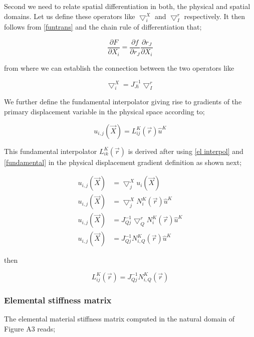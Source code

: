 Second we need to relate spatial differentiation in both, the physical and spatial domains.  Let us define these operators like $\bigtriangledown_i^X$ and $\bigtriangledown_I^r$ respectively. It then follows from \eqref{funtrans} and the chain rule of differentiation that;

\begin{equation}
\dfrac{\partial F}{\partial X_i}=\dfrac{\partial f}{\partial r_J}\dfrac{\partial r_J}{\partial X_i}
\label{chain}
\end{equation}

from where we can establish the connection between the two operators like


\begin{equation}
\bigtriangledown_i^X=J_{Ji}^{-1}\bigtriangledown_I^r
\label{fundamental}
\end{equation}

We further define the fundamental interpolator giving rise to gradients of the primary displacement variable in the physical space according to;


\begin{equation}
u_{i,j}(\vec{X})=L_{ij}^K(\vec{r})\hat{u}^K
\label{fund operator}
\end{equation}


This fundamental interpolator  $L_{ik}^K(\vec{r})$ is derived after using \eqref{el interpol} and \eqref{fundamental} in the physical displacement gradient definition as shown next;


\[
\begin{aligned}
u_{i,j}(\vec{X})&=\bigtriangledown_j^X u_i(\vec{X})\\
u_{i,j}(\vec{X})&=\bigtriangledown_j^X N_i^K(\vec{r})\hat{u}^K\\
u_{i,j}(\vec{X})&=J_{Qj}^{-1}\bigtriangledown_Q^r N_i^K(\vec{r})\hat{u}^K\\
u_{i,j}(\vec{X})&=J_{Qj}^{-1}N_{i,Q}^K(\vec{r})\hat{u}^K
\end{aligned}
\]

then

\begin{equation}
L_{ij}^K(\vec{r})=J_{Qj}^{-1}N_{i,Q}^K(\vec{r})
\label{fundamental interpolator}
\end{equation}

\subsubsection{Elemental stiffness matrix}
The elemental material stiffness matrix computed in the natural domain of Figure A3 reads;



